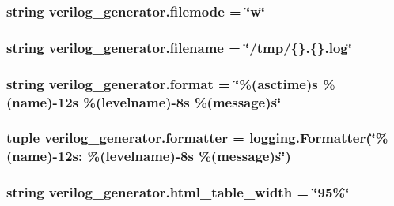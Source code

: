 \hypertarget{namespaceverilog__generator_a36e53540e6ae38d5e5e1d87cba949016}{
\subsubsection[{filemode}]{\setlength{\rightskip}{0pt plus 5cm}string verilog\-\_\-generator.\-filemode = \char`\"{}w\char`\"{}}}\label{namespaceverilog__generator_a36e53540e6ae38d5e5e1d87cba949016}
\hypertarget{namespaceverilog__generator_a74645f88578da230e576aaf69299fa2d}{
\subsubsection[{filename}]{\setlength{\rightskip}{0pt plus 5cm}string verilog\-\_\-generator.\-filename = \char`\"{}/tmp/\{\}.\{\}.log\char`\"{}}}\label{namespaceverilog__generator_a74645f88578da230e576aaf69299fa2d}
\hypertarget{namespaceverilog__generator_a15bd2d3bf5324274289ab73246b585bf}{
\subsubsection[{format}]{\setlength{\rightskip}{0pt plus 5cm}string verilog\-\_\-generator.\-format = \char`\"{}\%(asctime)s \%(name)-\/12s \%(levelname)-\/8s \%(message)s\char`\"{}}}\label{namespaceverilog__generator_a15bd2d3bf5324274289ab73246b585bf}
\hypertarget{namespaceverilog__generator_acadbc9500b6eafb53dca88de5dd2ca81}{
\subsubsection[{formatter}]{\setlength{\rightskip}{0pt plus 5cm}tuple verilog\-\_\-generator.\-formatter = logging.\-Formatter(\char`\"{}\%(name)-\/12s\-: \%(levelname)-\/8s \%(message)s\char`\"{})}}\label{namespaceverilog__generator_acadbc9500b6eafb53dca88de5dd2ca81}
\hypertarget{namespaceverilog__generator_a599ad76910e1a4ff51f628cc081c2318}{
\subsubsection[{html\-\_\-table\-\_\-width}]{\setlength{\rightskip}{0pt plus 5cm}string verilog\-\_\-generator.\-html\-\_\-table\-\_\-width = \char`\"{}95\%\char`\"{}}}\label{namespaceverilog__generator_a599ad76910e1a4ff51f628cc081c2318}
